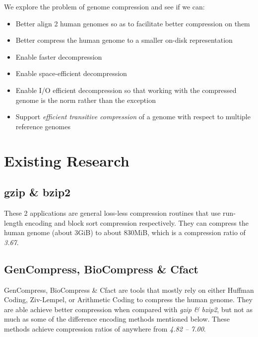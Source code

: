 \documentclass[11pt]{article}
\begin{document}
We explore the problem of genome compression and see if we can:

\begin{itemize}

\item Better align 2 human genomes so as to facilitate better
  compression on them

\item Better compress the human genome to a smaller on-disk
  representation

\item Enable faster decompression

\item Enable space-efficient decompression

\item Enable I/O efficient decompression so that working with the
  compressed genome is the norm rather than the exception

\item Support \textit{efficient transitive compression} of a genome
  with respect to multiple reference genomes

\end{itemize}

\section{Existing Research}

\subsection{gzip \& bzip2}

These 2 applications are general loss-less compression routines that
use run-length encoding and block sort compression respectively. They
can compress the human genome (about 3GiB) to about 830MiB, which is a
compression ratio of \textit{3.67}.

\subsection{GenCompress, BioCompress \& Cfact}

GenCompress\cite{gencompress}, BioCompress\cite{biocompress} \&
Cfact\cite{cfact} are tools that mostly rely on either Huffman Coding,
Ziv-Lempel\cite{zivlempel}, or Arithmetic Coding to compress the human
genome. They are able achieve better compression when compared with
\textit{gzip \& bzip2}, but not as much as some of the difference
encoding methods mentioned below. These methods achieve compression
ratios of anywhere from \textit{4.82 -- 7.00}.
\end{document}
